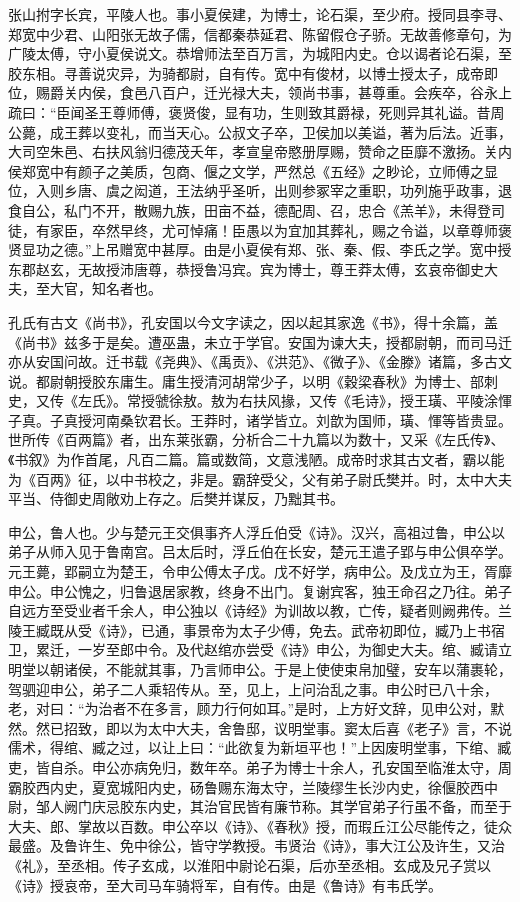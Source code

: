 \documentclass[]{article}
\begin{document}
张山拊字长宾，平陵人也。事小夏侯建，为博士，论石渠，至少府。授同县李寻、郑宽中少君、山阳张无故子儒，信都秦恭延君、陈留假仓子骄。无故善修章句，为广陵太傅，守小夏侯说文。恭增师法至百万言，为城阳内史。仓以谒者论石渠，至胶东相。寻善说灾异，为骑都尉，自有传。宽中有俊材，以博士授太子，成帝即位，赐爵关内侯，食邑八百户，迁光禄大夫，领尚书事，甚尊重。会疾卒，谷永上疏曰：``臣闻圣王尊师傅，褒贤俊，显有功，生则致其爵禄，死则异其礼谥。昔周公薨，成王葬以变礼，而当天心。公叔文子卒，卫侯加以美谥，著为后法。近事，大司空朱邑、右扶风翁归德茂夭年，孝宣皇帝愍册厚赐，赞命之臣靡不激扬。关内侯郑宽中有颜子之美质，包商、偃之文学，严然总《五经》之眇论，立师傅之显位，入则乡唐、虞之闳道，王法纳乎圣听，出则参冢宰之重职，功列施乎政事，退食自公，私门不开，散赐九族，田亩不益，德配周、召，忠合《羔羊》，未得登司徒，有家臣，卒然早终，尤可悼痛！臣愚以为宜加其葬礼，赐之令谥，以章尊师褒贤显功之德。''上吊赠宽中甚厚。由是小夏侯有郑、张、秦、假、李氏之学。宽中授东郡赵玄，无故授沛唐尊，恭授鲁冯宾。宾为博士，尊王莽太傅，玄哀帝御史大夫，至大官，知名者也。

孔氏有古文《尚书》，孔安国以今文字读之，因以起其家逸《书》，得十余篇，盖《尚书》兹多于是矣。遭巫蛊，未立于学官。安国为谏大夫，授都尉朝，而司马迁亦从安国问故。迁书载《尧典》、《禹贡》、《洪范》、《微子》、《金滕》诸篇，多古文说。都尉朝授胶东庸生。庸生授清河胡常少子，以明《穀梁春秋》为博士、部刺史，又传《左氏》。常授虢徐敖。敖为右扶风掾，又传《毛诗》，授王璜、平陵涂惲子真。子真授河南桑钦君长。王莽时，诸学皆立。刘歆为国师，璜、惲等皆贵显。世所传《百两篇》者，出东莱张霸，分析合二十九篇以为数十，又采《左氏传》、《书叙》为作首尾，凡百二篇。篇或数简，文意浅陋。成帝时求其古文者，霸以能为《百两》征，以中书校之，非是。霸辞受父，父有弟子尉氏樊并。时，太中大夫平当、侍御史周敞劝上存之。后樊并谋反，乃黜其书。

申公，鲁人也。少与楚元王交俱事齐人浮丘伯受《诗》。汉兴，高祖过鲁，申公以弟子从师入见于鲁南宫。吕太后时，浮丘伯在长安，楚元王遣子郢与申公俱卒学。元王薨，郢嗣立为楚王，令申公傅太子戊。戊不好学，病申公。及戊立为王，胥靡申公。申公愧之，归鲁退居家教，终身不出门。复谢宾客，独王命召之乃往。弟子自远方至受业者千余人，申公独以《诗经》为训故以教，亡传，疑者则阙弗传。兰陵王臧既从受《诗》，已通，事景帝为太子少傅，免去。武帝初即位，臧乃上书宿卫，累迁，一岁至郎中令。及代赵绾亦尝受《诗》申公，为御史大夫。绾、臧请立明堂以朝诸侯，不能就其事，乃言师申公。于是上使使束帛加璧，安车以蒲裹轮，驾驷迎申公，弟子二人乘轺传从。至，见上，上问治乱之事。申公时已八十余，老，对曰：``为治者不在多言，顾力行何如耳。''是时，上方好文辞，见申公对，默然。然已招致，即以为太中大夫，舍鲁邸，议明堂事。窦太后喜《老子》言，不说儒术，得绾、臧之过，以让上曰：``此欲复为新垣平也！''上因废明堂事，下绾、臧吏，皆自杀。申公亦病免归，数年卒。弟子为博士十余人，孔安国至临淮太守，周霸胶西内史，夏宽城阳内史，砀鲁赐东海太守，兰陵缪生长沙内史，徐偃胶西中尉，邹人阙门庆忌胶东内史，其治官民皆有廉节称。其学官弟子行虽不备，而至于大夫、郎、掌故以百数。申公卒以《诗》、《春秋》授，而瑕丘江公尽能传之，徒众最盛。及鲁许生、免中徐公，皆守学教授。韦贤治《诗》，事大江公及许生，又治《礼》，至丞相。传子玄成，以淮阳中尉论石渠，后亦至丞相。玄成及兄子赏以《诗》授哀帝，至大司马车骑将军，自有传。由是《鲁诗》有韦氏学。
\end{document}
